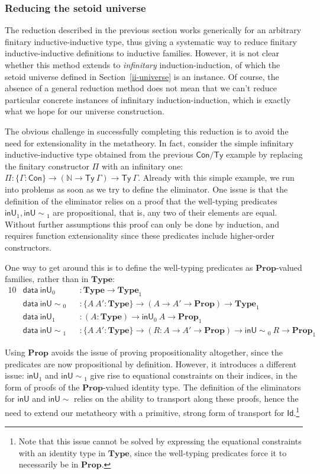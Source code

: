 \documentclass[a4paper,UKenglish,cleveref, autoref, thm-restate]{lipics-v2019}
\newcommand{\GG}{\Gamma}
\newcommand{\inU}{\mathsf{inU}}
\newcommand{\inUU}{\mathsf{inU{\sim}}}
\newcommand{\mType}{\mathbf{Type}}
\newcommand{\mProp}{\mathbf{Prop}}
\begin{document}
\subsubsection{Reducing the setoid universe}\label{inductive-universe}

The reduction described in the previous section works generically for an
arbitrary finitary inductive-inductive type, thus giving a systematic way to
reduce finitary inductive-inductive definitions to inductive families. However,
it is not clear whether this method extends to \emph{infinitary}
induction-induction, of which the setoid universe defined in
Section~\ref{ii-universe} is an instance.
%
Of course, the absence of a general reduction method does not mean that we can't
reduce particular concrete instances of infinitary induction-induction, which is
exactly what we hope for our universe construction.

The obvious challenge in successfully completing this reduction is to avoid the
need for extensionality in the metatheory. In fact, consider the simple
infinitary inductive-inductive type obtained from the previous $\textsf{Con/Ty}$
example by replacing the finitary constructor $\Pi$ with an infinitary one: $\Pi
: \{\GG : \textsf{Con}\} \to (\mathds{N} \to \textsf{Ty}\ \GG) \to
\textsf{Ty}\ \GG$. Already with this simple example, we run into problems as
soon as we try to define the eliminator. One issue is that the definition of the
eliminator relies on a proof that the well-typing predicates $\inU_1,
\inUU_1$ are propositional, that is, any two of their elements are equal.
%
Without further assumptions this proof can only be done by induction, and
requires function extensionality since these predicates include higher-order
constructors.

One way to get around this is to define the well-typing predicates as
$\mProp$-valued families, rather than in $\mType$:
\begin{alignat*}{10}
  & \textsf{data}\ \inU_0 && : \mType \to \mType_1 \\
  & \textsf{data}\ \inUU_0 && : \{A\ A' : \mType\} \to (A \to A' \to \mProp) \to \mType_1 \\
  & \textsf{data}\ \inU_1 && : (A : \mType) \to \inU_0\ A \to \mProp_1 \\
  & \textsf{data}\ \inUU_1 && : \{A\ A' : \mType\} \to (R : A \to A' \to \mProp) \to \inUU_0\ R \to \mProp_1
\end{alignat*}

Using $\mProp$ avoids the issue of proving propositionality altogether, since the
predicates are now propositional by definition.
%
However, it introduces a different issue: $\inU_1$ and $\inUU_1$ give
rise to equational constraints on their indices, in the form of proofs of the
$\mProp$-valued identity type. The definition of the eliminators for $\inU$
and $\inUU$ relies on the ability to transport along these proofs, hence
the need to extend our metatheory with a primitive, strong form of transport for
$\textsf{Id}$.\footnote{Note that this issue cannot be solved by expressing the
  equational constraints with an identity type in $\mType$, since the
  well-typing predicates force it to necessarily be in $\mProp$.}
\end{document}
